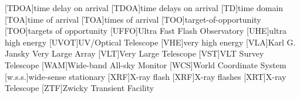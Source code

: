 \begin{acronym}
[TDOA]{time delay on arrival}
[TDOA]{time delays on arrival}
[TD]{time domain}
[TOA]{time of arrival}
[TOA]{times of arrival}
[TOO]{target\nobreakdashes-of\nobreakdashes-opportunity}
[TOO]{targets of opportunity}
[UFFO]{Ultra Fast Flash Observatory}
[UHE]{ultra high energy}
[UVOT]{UV/Optical Telescope}
[VHE]{very high energy}
[VLA]{Karl G. Jansky Very Large Array}
[VLT]{Very Large Telescope}
[VST]{\acs{VLT} Survey Telescope}
[WAM]{Wide\nobreakdashes-band All\nobreakdashes-sky Monitor}
[WCS]{World Coordinate System}
[w.s.s.]{wide\nobreakdashes-sense stationary}
[XRF]{X\nobreakdashes-ray flash}
[XRF]{X\nobreakdashes-ray flashes}
[XRT]{X\nobreakdashes-ray Telescope}
[ZTF]{Zwicky Transient Facility}
\end{acronym}

